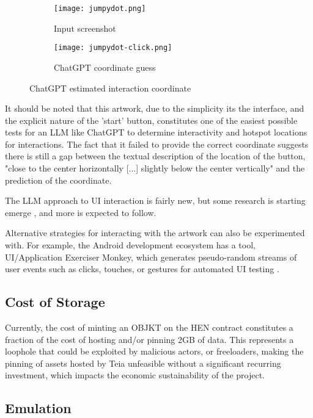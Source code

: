 \begin{figure}[H]
  \centering
  \begin{subfigure}[b]{0.45\textwidth}
    \centering
    \texttt{[image: jumpydot.png]}
    \caption{Input screenshot}
    \label{fig:image1}
  \end{subfigure}
  \hfill
  \begin{subfigure}[b]{0.45\textwidth}
    \centering
    \texttt{[image: jumpydot-click.png]}
    \caption{ChatGPT coordinate guess}
    \label{fig:image2}
  \end{subfigure}
  \caption{ChatGPT estimated interaction coordinate}
  \label{fig:chat-gpt-click-guess}
\end{figure}

It should be noted that this artwork, due to the simplicity its the interface, and the explicit nature of the 'start' button, constitutes one of the easiest possible tests for an LLM like ChatGPT to determine interactivity and hotspot locations for interactions. The fact that it failed to provide the correct coordinate suggests there is still a gap between the textual description of the location of the button, "close to the center horizontally [...] slightly below the center vertically" and the prediction of the coordinate.

The LLM approach to UI interaction is fairly new, but some research is starting emerge \cite{liuMakeLLMTesting2024}, and more is expected to follow.

Alternative strategies for interacting with the artwork can also be experimented with. For example, the Android development ecosystem has a tool, UI/Application Exerciser Monkey, which generates pseudo-random streams of user events such as clicks, touches, or gestures for automated UI testing \cite{UIApplicationExerciser}.

\subsection{Cost of Storage}

Currently, the cost of minting an OBJKT on the HEN contract constitutes a fraction of the cost of hosting and/or pinning 2GB of data. This represents a loophole that could be exploited by malicious actors, or freeloaders, making the pinning of assets hosted by Teia unfeasible without a significant recurring investment, which impacts the economic sustainability of the project.

\subsection{Emulation}

